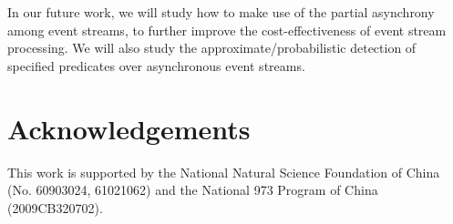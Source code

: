 \documentclass[12pt,journal,letterpaper,compsoc]{IEEEtran}
\begin{document}
In our future work, we will study how to make use of the partial asynchrony among event streams, to further improve the cost-effectiveness of event stream processing. We will also study the approximate/probabilistic detection of specified predicates over asynchronous event streams.

\section*{Acknowledgements}

This work is supported by the National Natural Science Foundation of China (No. 60903024, 61021062) and the National 973 Program of China (2009CB320702).



\end{document}
